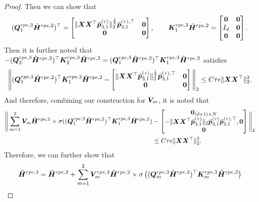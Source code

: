 \begin{proof}
    Then we can show that
    \begin{align*}
        (\boldsymbol{Q}_1^{rpe,3}\tilde{\boldsymbol{H}}^{rpe,2})^\top =\begin{bmatrix}
            \Vert\boldsymbol{X}\boldsymbol{X}^\top\tilde{\boldsymbol{p}}_{3,1}^{(\tau)}\Vert_2^{\frac{1}{2}}\tilde{\boldsymbol{p}}_{3,1}^{(\tau),\top}&\boldsymbol{0}\\
            \boldsymbol{0}&\boldsymbol{0}
        \end{bmatrix},\qquad\boldsymbol{K}_1^{rpe,3}\tilde{\boldsymbol{H}}^{rpe,2}=\begin{bmatrix}
            \boldsymbol{0}&\boldsymbol{0}\\
            I_d&\boldsymbol{0}\\
            \boldsymbol{0}&\boldsymbol{0}
        \end{bmatrix}.
    \end{align*}
    Then it is further noted that
    $
       -(\boldsymbol{Q}_2^{rpe,3}\tilde{\boldsymbol{H}}^{rpe,2})^\top\boldsymbol{K}_2^{rpe,3}\tilde{\boldsymbol{H}}^{rpe,2}= (\boldsymbol{Q}_1^{rpe,3}\tilde{\boldsymbol{H}}^{rpe,2})^\top\boldsymbol{K}_1^{rpe,3}\tilde{\boldsymbol{H}}^{rpe,2} 
    $ satisfies
    \begin{align*}
        \Bigg\Vert(\boldsymbol{Q}_1^{rpe,3}\tilde{\boldsymbol{H}}^{rpe,2})^\top\boldsymbol{K}_1^{rpe,3}\tilde{\boldsymbol{H}}^{rpe,2}-\begin{bmatrix}
            \Vert\boldsymbol{X}\boldsymbol{X}^\top\tilde{\boldsymbol{p}}_{3,1}^{(\tau)}\Vert_2^{\frac{1}{2}}\tilde{\boldsymbol{p}}_{3,1}^{(\tau),\top}&\boldsymbol{0}\\
            \boldsymbol{0}&\boldsymbol{0}
        \end{bmatrix}\Bigg\Vert_2\leq C\tau\epsilon\Vert\boldsymbol{X}\boldsymbol{X}^\top\Vert_2^2.
    \end{align*}
    And therefore, combining our construction for $\boldsymbol{V}_m$, it is noted that
    \begin{align*}
        \Bigg\Vert\sum_{m=1}^2\boldsymbol{V}_m\tilde{\boldsymbol{H}}^{rpe,2}\times\sigma((\boldsymbol{Q}_1^{rpe,3}\tilde{\boldsymbol{H}}^{rpe,2})^\top\boldsymbol{K}_1^{rpe,3}\tilde{\boldsymbol{H}}^{rpe,2})&-\begin{bmatrix}
            \boldsymbol{0}_{(d+1)\times N}\\
            -\Vert\boldsymbol{X}\boldsymbol{X}^\top\tilde{\boldsymbol{p}}_{3,1}^{(\tau)}\Vert_2\tilde{\boldsymbol{p}}_{3,1}^{(\tau)}\tilde{\boldsymbol{p}}_{3,1}^{(\tau),\top},\boldsymbol{0}\\
            \boldsymbol{0}
        \end{bmatrix}\Bigg\Vert_2\\
        &\leq C\tau\epsilon\Vert\boldsymbol{X}\boldsymbol{X}^\top\Vert_2^2.
    \end{align*}
    Therefore, we can further show that
    \begin{align*}
        \tda H^{rpe,3} =\tda H^{rpe,2}+ \sum_{m=1}^2\bfa V_{m}^{rpe,3}\tda H^{rpe,2}\times\sigma\lef((\bfa Q_m^{rpe,3}\tda H^{rpe,2})^\top\bfa K_m^{rpe,3}\tda H^{rpe,2}\rig)

\end{align*}
\end{proof}
